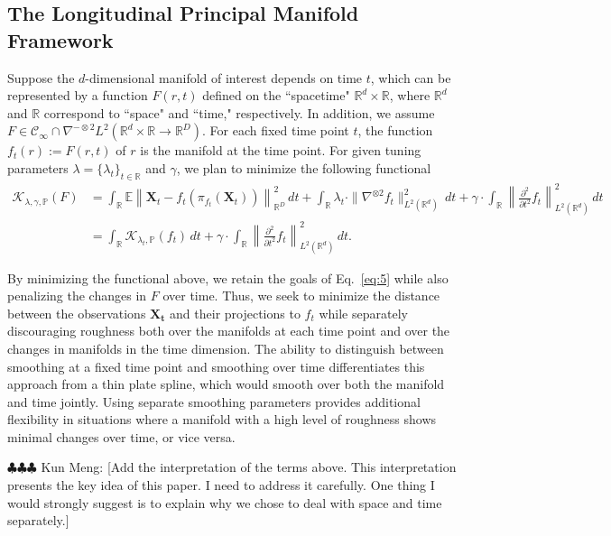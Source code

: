 \documentclass[11pt,reqno]{article}
\newcommand{\meng}[1]{{\color{purple} \sf $\clubsuit\clubsuit\clubsuit$ Kun Meng: [#1]}}
\theoremstyle{definition}
\begin{document}
\subsection{The Longitudinal Principal Manifold Framework}

Suppose the $d$-dimensional manifold of interest depends on time $t$, which can be represented by a function $F(r,t)$ defined on the ``spacetime" $\mathbb{R}^d\times\mathbb{R}$, where $\mathbb{R}^d$ and $\mathbb{R}$ correspond to ``space" and ``time," respectively. In addition, we assume $F\in\mathcal{C}_\infty\cap\nabla^{-\otimes2}L^2(\mathbb{R}^d\times\mathbb{R}\rightarrow\mathbb{R}^D)$. For each fixed time point $t$, the function $f_t(r):=F(r,t)$ of $r$ is the manifold at the time point. For given tuning parameters $\lambda=\{\lambda_t\}_{t\in\mathbb{R}}$ and $\gamma$, we plan to minimize the following functional
\begin{align}
  \mathcal{K}_{\lambda, \gamma, \mathbb{P}}(F) &= \int_\mathbb{R} \mathbb{E}\left\|\boldsymbol{X}_t - f_t\left(\pi_{f_t}(\boldsymbol{X}_t)\right)\right\|_{\mathbb{R}^{D}}^2 \, dt + \int_\mathbb{R} \lambda_t \cdot\|\nabla^{\otimes 2}f_t\|_{L^2(\mathbb{R}^{d})}^2 \, dt + \gamma\cdot \int_{\mathbb{R}}\left\|\frac{\partial^2}{\partial t^2}f_t\right\|_{L^2(\mathbb{R}^d)}^2 \, dt \label{eq:11} \\
  &= \int_{\mathbb{R}}\mathcal{K}_{\lambda_t, \mathbb{P}}(f_t) \, dt + \gamma \cdot \int_{\mathbb{R}}\left\|\frac{\partial^2}{\partial t^2}f_t\right\|_{L^2(\mathbb{R}^d)}^2 \, dt \nonumber
.\end{align}

By minimizing the functional above, we retain the goals of Eq.~\eqref{eq:5} while also penalizing the changes in $F$ over time. Thus, we seek to minimize the distance between the observations $\mathbf{X_t}$ and their projections to $f_t$ while separately discouraging roughness both over the manifolds at each time point and over the changes in manifolds in the time dimension. The ability to distinguish between smoothing at a fixed time point and smoothing over time differentiates this approach from a thin plate spline, which would smooth over both the manifold and time jointly. Using separate smoothing parameters provides additional flexibility in situations where a manifold with a high level of roughness shows minimal changes over time, or vice versa.

\meng{Add the interpretation of the terms above. This interpretation presents the key idea of this paper. I need to address it carefully. One thing I would strongly suggest is to explain why we chose to deal with space and time separately.}
\end{document}
